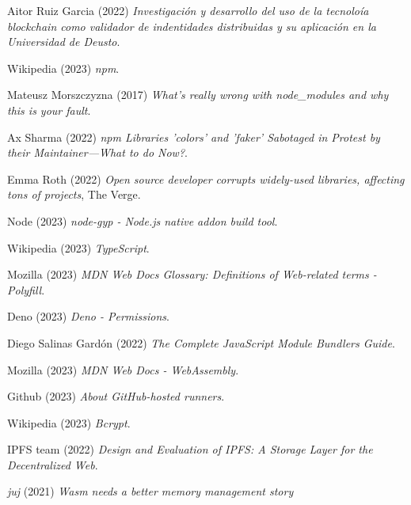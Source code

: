 \documentclass[12pt, letterpaper]{article}
\begin{document}
\begin{thebibliography}{9}
    Aitor Ruiz Garcia (2022) \emph{Investigación y desarrollo del uso de la tecnoloía blockchain como validador de indentidades distribuidas y su aplicación en la Universidad de Deusto}.

    Wikipedia (2023) \emph{npm}.

    Mateusz Morszczyzna (2017) \emph{What's really wrong with node\_modules and why this is your fault}.

    Ax Sharma (2022) \emph{npm Libraries 'colors' and 'faker' Sabotaged in Protest by their Maintainer—What to do Now?}.

    Emma Roth (2022) \emph{Open source developer corrupts widely-used libraries, affecting tons of projects}, The Verge.

    Node (2023) \emph{node-gyp - Node.js native addon build tool}.

    Wikipedia (2023) \emph{TypeScript}.

    Mozilla (2023) \emph{MDN Web Docs Glossary: Definitions of Web-related terms - Polyfill}.

    Deno (2023) \emph{Deno - Permissions}.

    Diego Salinas Gardón (2022) \emph{The Complete JavaScript Module Bundlers Guide}.

    Mozilla (2023) \emph{MDN Web Docs - WebAssembly}.

    Github (2023) \emph{About GitHub-hosted runners}.

    Wikipedia (2023) \emph{Bcrypt}.

    IPFS team (2022) \emph{Design and Evaluation of IPFS: A Storage Layer for the Decentralized Web}.

    \textit{juj} (2021) \emph{Wasm needs a better memory management story}

\end{thebibliography}
\end{document}
